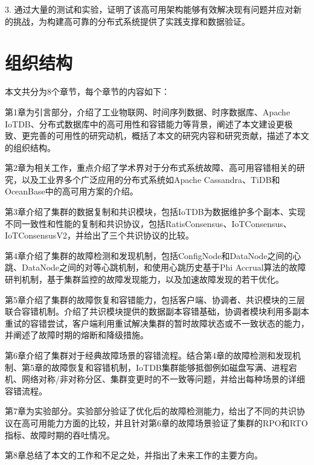 3. 通过大量的测试和实验，证明了该高可用架构能够有效解决现有问题并应对新的挑战，为构建高可靠的分布式系统提供了实践支撑和数据验证。


\section{组织结构}
本文共分为8个章节，每个章节的内容如下：

第1章为引言部分，介绍了工业物联网、时间序列数据、时序数据库、Apache IoTDB、分布式数据库中的高可用性和容错能力等背景，阐述了本文建设更极致、更完善的可用性的研究动机，概括了本文的研究内容和研究贡献，描述了本文的组织结构。

第2章为相关工作，重点介绍了学术界对于分布式系统故障、高可用容错相关的研究，以及工业界多个广泛应用的分布式系统如Apache Cassandra、TiDB和OceanBase中的高可用方案的介绍。

第3章介绍了集群的数据复制和共识模块，包括IoTDB为数据维护多个副本、实现不同一致性和性能的复制和共识协议，包括RatisConsensus、IoTConsensus、IoTConsensusV2，并给出了三个共识协议的比较。

第4章介绍了集群的故障检测和发现机制，包括ConfigNode和DataNode之间的心跳、DataNode之间的对等心跳机制，和使用心跳历史基于Phi Accrual算法的故障研判机制，基于集群监控的故障发现能力，以及加速故障发现的若干优化。

第5章介绍了集群的故障恢复和容错能力，包括客户端、协调者、共识模块的三层联合容错机制。介绍了共识模块提供的数据副本容错基础，协调者模块利用多副本重试的容错尝试，客户端利用重试解决集群的暂时故障状态或不一致状态的能力，并阐述了故障时期的熔断和降级措施。

第6章介绍了集群对于经典故障场景的容错流程。结合第4章的故障检测和发现机制、第5章的故障恢复和容错机制，IoTDB集群能够抵御例如磁盘写满、进程宕机、网络对称/非对称分区、集群变更时的不一致等问题，并给出每种场景的详细容错流程。

第7章为实验部分。实验部分验证了优化后的故障检测能力，给出了不同的共识协议在高可用能力方面的比较，并且针对第6章的故障场景验证了集群的RPO和RTO指标、故障时期的吞吐情况。

第8章总结了本文的工作和不足之处，并指出了未来工作的主要方向。